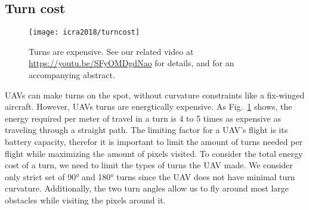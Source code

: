 \subsection{Turn cost}

\begin{figure}[h]
\begin{center}
\texttt{[image: icra2018/turncost]}
\caption[Mosquito hunting drone]{Turns are expensive. See our related video at
\url{https://youtu.be/SFyOMDgdNao} for details, and
\cite{becker2017zapping} for an accompanying abstract.} \label{fig:turncost}
\end{center}
\vspace{-1em}
\end{figure}

UAVs can make turns on the spot, without curvature constraints like a fix-winged aircraft.
However, UAVs turns are energtically expensive.
As Fig.~\ref{fig:turncost} shows, the energy required per meter of travel in a turn is 4 to 5 times as expensive as traveling through a straight path.
The limiting factor for a UAV's flight is its battery capacity, therefor it is important to limit the amount of turns needed per flight while maximizing the amount of pixels visited.
To consider the total energy cost of a turn, we need to limit the types of turns the UAV made.
We consider only strict set of \ang{90} and \ang{180} turns since the UAV does not have minimal turn curvature.
Additionally, the two turn angles allow us to fly around most large obstacles while visiting the pixels around it.



